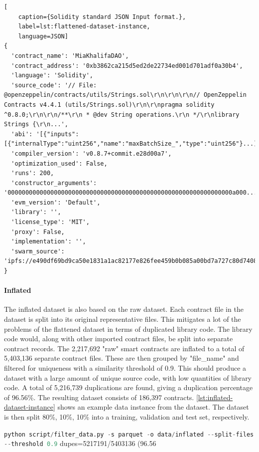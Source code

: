 \begin{lstlisting}[
    caption={Solidity standard JSON Input format.},
    label=lst:flattened-dataset-instance,
    language=JSON]
{
  'contract_name': 'MiaKhalifaDAO',
  'contract_address': '0xb3862ca215d5ed2de22734ed001d701adf0a30b4',
  'language': 'Solidity',
  'source_code': '// File: @openzeppelin/contracts/utils/Strings.sol\r\n\r\n\r\n// OpenZeppelin Contracts v4.4.1 (utils/Strings.sol)\r\n\r\npragma solidity ^0.8.0;\r\n\r\n/**\r\n * @dev String operations.\r\n */\r\nlibrary Strings {\r\n...',
  'abi': '[{"inputs":[{"internalType":"uint256","name":"maxBatchSize_","type":"uint256"}...]',
  'compiler_version': 'v0.8.7+commit.e28d00a7',
  'optimization_used': False,
  'runs': 200,
  'constructor_arguments': '000000000000000000000000000000000000000000000000000000000000000a000...',
  'evm_version': 'Default',
  'library': '',
  'license_type': 'MIT',
  'proxy': False,
  'implementation': '',
  'swarm_source': 'ipfs://e490df69bd9ca50e1831a1ac82177e826fee459b0b085a00bd7a727c80d74089'
}
\end{lstlisting}

\paragraph{Inflated}
\label{sec:verified-smart-contracts-inflated}
The inflated dataset is also based on the raw dataset. Each contract file in the dataset is split into its original representative files. This mitigates a lot of the problems of the flattened dataset in terms of duplicated library code. The library code would, along with other imported contract files, be split into separate contract records. The 2,217,692 "raw" smart contracts are inflated to a total of 5,403,136 separate contract files. These are then grouped by "file\_name" and filtered for uniqueness with a similarity threshold of 0.9. This should produce a dataset with a large amount of unique source code, with low quantities of library code. A total of 5,216,739 duplications are found, giving a duplication percentage of 96.56\%. The resulting dataset consists of 186,397 contracts. \cref{lst:inflated-dataset-instance} shows an example data instance from the dataset. The dataset is then split 80\%, 10\%, 10\% into a training, validation and test set, respectively.



\lstinline[language=Python]!python script/filter_data.py -s parquet -o data/inflated --split-files --threshold 0.9!
dupes=5217191/5403136 (96.56%


